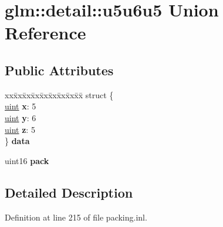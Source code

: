 \hypertarget{unionglm_1_1detail_1_1u5u6u5}{}\section{glm\+:\+:detail\+:\+:u5u6u5 Union Reference}
\label{unionglm_1_1detail_1_1u5u6u5}
\subsection*{Public Attributes}
\begin{DoxyCompactItemize}
\item 
\mbox{\label{unionglm_1_1detail_1_1u5u6u5_a957492a30539dd0a076ea36d63cd10f9}} 
\begin{tabbing}
xx\=xx\=xx\=xx\=xx\=xx\=xx\=xx\=xx\=\kill
struct \{\\
\mbox{\label{unionglm_1_1detail_1_1u5u6u5_a1e181e884f292837706d7cc74e50fd7d}} 
\hyperlink{group__core__precision_ga4fd29415871152bfb5abd588334147c8}{uint} {\bfseries x}: 5\\
\mbox{\label{unionglm_1_1detail_1_1u5u6u5_a72d656a13aa6d62e6a4f0114be36fc6d}} 
\hyperlink{group__core__precision_ga4fd29415871152bfb5abd588334147c8}{uint} {\bfseries y}: 6\\
\mbox{\label{unionglm_1_1detail_1_1u5u6u5_aad73566e426c3075630b529517f0d831}} 
\hyperlink{group__core__precision_ga4fd29415871152bfb5abd588334147c8}{uint} {\bfseries z}: 5\\
\} {\bfseries data}\\

\end{tabbing}\item 
\mbox{\label{unionglm_1_1detail_1_1u5u6u5_a5ea89c1a491b7e1442cad93d92628b2e}} 
uint16 {\bfseries pack}
\end{DoxyCompactItemize}


\subsection{Detailed Description}


Definition at line 215 of file packing.\+inl.



